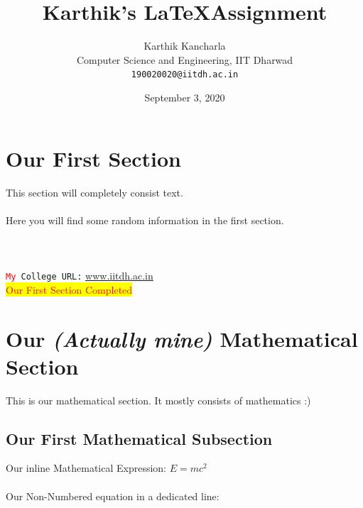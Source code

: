 \documentclass{article}
\title{Karthik's \LaTeX Assignment}
\author{Karthik Kancharla \\
Computer Science and Engineering, IIT Dharwad\\

\texttt{190020020@iitdh.ac.in}}
\date{September 3, 2020}
\begin{document}
\tableofcontents
\listoffigures
\listoftables

\maketitle
\section{Our First Section}
This section will completely consist text.\\
\\
Here you will find some random information in the first section.
\\
\\
\blindtext
\\
\\
\texttt{\huge \textcolor{red}{My }College URL:}  \url{ www.iitdh.ac.in}
\\
\colorbox{yellow}{\textcolor{red}{\huge Our First Section Completed}}
\section{Our \textit{(Actually mine) }Mathematical Section}
This is our mathematical section. It mostly consists of mathematics :)\\
\subsection{Our First Mathematical Subsection}
Our inline Mathematical Expression: $E = mc^2$
\\
\\
Our Non-Numbered equation in a dedicated line: 
\end{document}
